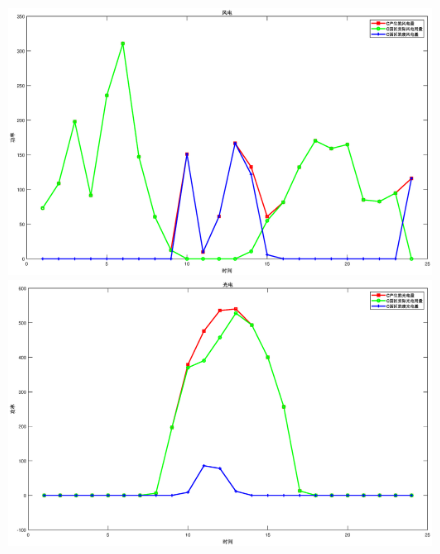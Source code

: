 \documentclass{cumcmthesis}
\begin{document}
\begin{figure}[!h]  
\centering  
\begin{minipage}{.5\textwidth}  
  \centering  
  \includegraphics[width=.9\linewidth]{figures/Q1_3_C_wind.eps}  
\end{minipage}%
\begin{minipage}{.5\textwidth}  
  \centering  
  \includegraphics[width=.9\linewidth]{figures/Q1_3_C_light.eps}  
\end{minipage}  
  
\par\medskip %
  

\end{figure}
\end{document}
